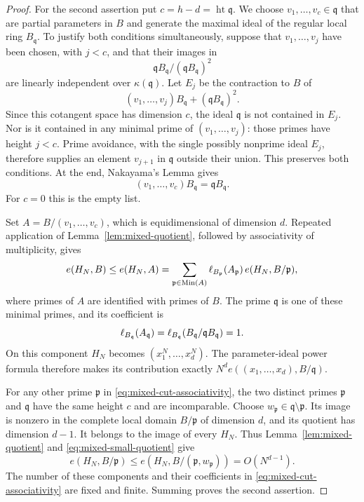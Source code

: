 \begin{proof}
For the second assertion put $c=h-d=\operatorname{ht}\mathfrak q$.
We choose $v_1,\ldots,v_c\in\mathfrak q$ that are partial parameters
in $B$ and generate the maximal ideal of the regular local ring
$B_{\mathfrak q}$.  To justify both conditions simultaneously,
suppose that $v_1,\ldots,v_j$ have been chosen, with $j<c$, and that
their images in
\[
 \mathfrak qB_{\mathfrak q}/(\mathfrak qB_{\mathfrak q})^2
\]
are linearly independent over $\kappa(\mathfrak q)$.  Let $E_j$ be
the contraction to $B$ of
\[
 (v_1,\ldots,v_j)B_{\mathfrak q}
                 +(\mathfrak qB_{\mathfrak q})^2.
\]
Since this cotangent space has dimension $c$, the ideal
$\mathfrak q$ is not contained in $E_j$.  Nor is it contained in
any minimal prime of $(v_1,\ldots,v_j)$: those primes have height
$j<c$.  Prime avoidance, with the single possibly nonprime ideal
$E_j$, therefore supplies an element $v_{j+1}$ in $\mathfrak q$
outside their union.  This preserves both conditions.  At the end,
Nakayama's Lemma gives
\[
 (v_1,\ldots,v_c)B_{\mathfrak q}=\mathfrak qB_{\mathfrak q}.
\]
For $c=0$ this is the empty list.

Set $A=B/(v_1,\ldots,v_c)$, which is equidimensional of dimension
$d$.  Repeated application of Lemma~\ref{lem:mixed-quotient}, followed
by associativity of multiplicity, gives
\begin{equation}\label{eq:mixed-cut-associativity}
 e(H_N,B)\leq e(H_N,A)
   =\sum_{\mathfrak p\in\operatorname{Min}(A)}
      \operatorname{\ell}_{B_{\mathfrak p}}(A_{\mathfrak p})\,
      e(H_N,B/\mathfrak p),
\end{equation}
where primes of $A$ are identified with primes of $B$.
The prime $\mathfrak q$ is one of these minimal primes, and its
coefficient is
\[
 \operatorname{\ell}_{B_{\mathfrak q}}(A_{\mathfrak q})
 =\operatorname{\ell}_{B_{\mathfrak q}}
      (B_{\mathfrak q}/\mathfrak qB_{\mathfrak q})=1.
\]
On this component $H_N$ becomes $(x_1^N,\ldots,x_d^N)$.
The parameter-ideal power formula therefore makes its contribution
exactly $N^d e((x_1,\ldots,x_d),B/\mathfrak q)$.

For any other prime $\mathfrak p$ in
\eqref{eq:mixed-cut-associativity}, the two distinct primes
$\mathfrak p$ and $\mathfrak q$ have the same height $c$ and are
incomparable.  Choose $w_{\mathfrak p}\in\mathfrak q\setminus
\mathfrak p$.  Its image is nonzero in the complete local domain
$B/\mathfrak p$ of dimension $d$, and its quotient has dimension
$d-1$.  It belongs to the image of every $H_N$.  Thus
Lemma~\ref{lem:mixed-quotient} and
\eqref{eq:mixed-small-quotient} give
\[
 e(H_N,B/\mathfrak p)
 \leq e(H_N,B/(\mathfrak p,w_{\mathfrak p}))=O(N^{d-1}).
\]
The number of these components and their coefficients in
\eqref{eq:mixed-cut-associativity} are fixed and finite.  Summing
proves the second assertion.
\end{proof}

